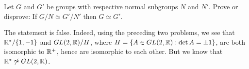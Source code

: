 \begin{exercise} Let $G$ and $G'$ be groups with respective normal subgroups
$N$ and $N'$.  Prove or disprove: If $G/N\simeq G'/N'$ then $G\simeq
G'$.
\end{exercise}

\begin{solution}[print=true]
The statement is false.  Indeed, using the preceding two problems, we see that $\mathbb{R}^*/\{1,-1\}$ and $GL(2,\mathbb{R})/H$,
where $H=\{A\in GL(2,\mathbb{R}):\det A =\pm 1\}$, are both isomorphic
to $\mathbb{R}^+$, hence are isomorphic to each other. But we know that
$\mathbb{R}^* \not\simeq GL(2,\mathbb{R})$.\end{solution}
